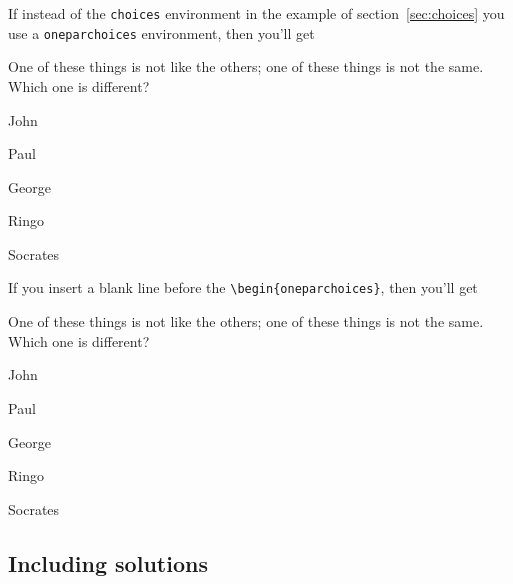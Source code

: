 \documentclass[12pt]{exam}
\begin{document}
If instead of the \verb"choices" environment in the example of
section~\ref{sec:choices} you use a \verb"oneparchoices" environment,
then you'll get
\begin{questions}
\question
One of these things is not like the others; one of these things is not
the same.  Which one is different?
\begin{oneparchoices}
\choice
John

\choice
Paul

\choice
George

\choice
Ringo

\choice
Socrates

\end{oneparchoices}
    
\end{questions}
If you insert a blank line before the \verb"\begin{oneparchoices}",
  then you'll get
\begin{questions}
\question
One of these things is not like the others; one of these things is not
the same.  Which one is different?

\begin{oneparchoices}
\choice
John

\choice
Paul

\choice
George

\choice
Ringo

\choice
Socrates

\end{oneparchoices}
    
\end{questions}



\subsection{Including solutions}
\label{sec:solutions}
\end{document}
